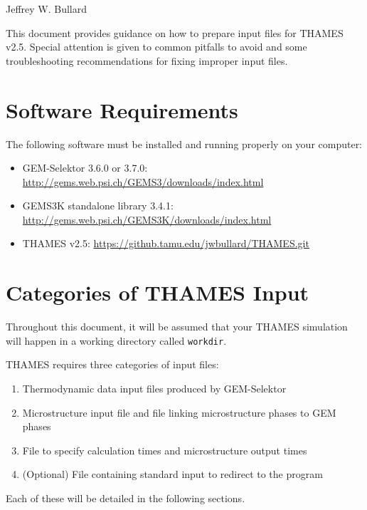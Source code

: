 \documentclass{article}
\begin{document}
\lstset{language=XML,stringstyle=\ttfamily}

\begin{center}
    \Large{\textbf{}}
\end{center}
\begin{center}
    \large{Jeffrey W. Bullard}
\end{center}
\begin{center}
    \large{\DTMnow}
\end{center}

\vspace{0.25truein}
\tableofcontents

\vspace{0.25truein}
This document provides guidance on how to prepare input files for THAMES v2.5.  Special
attention is given to common pitfalls to avoid and some troubleshooting recommendations
for fixing improper input files.

\section{Software Requirements}
The following software must be installed and running properly on your computer:
\begin{itemize}
    \item GEM-Selektor 3.6.0 or 3.7.0: \href{http://gems.web.psi.ch/GEMS3/downloads/index.html}{http://gems.web.psi.ch/GEMS3/downloads/index.html}
    \item GEMS3K standalone library 3.4.1: \href{http://gems.web.psi.ch/GEMS3K/downloads/index.html}{http://gems.web.psi.ch/GEMS3K/downloads/index.html}
    \item THAMES v2.5: \href{https://github.tamu.edu/jwbullard/THAMES.git}{https://github.tamu.edu/jwbullard/THAMES.git}
\end{itemize}

\section{Categories of THAMES Input}
Throughout this document, it will be assumed that your THAMES simulation will happen
in a working directory called \verb!workdir!.

THAMES requires three categories of input files:
\begin{enumerate}
    \item Thermodynamic data input files produced by GEM-Selektor
    \item Microstructure input file and file linking microstructure phases to GEM phases
    \item File to specify calculation times and microstructure output times
    \item (Optional) File containing standard input to redirect to the program
\end{enumerate}
Each of these will be detailed in the following sections.
\end{document}

